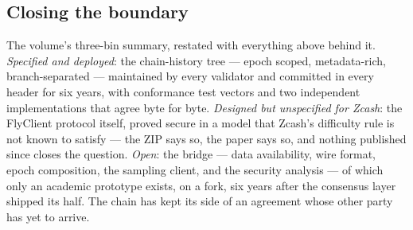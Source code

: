 \documentclass[11pt,a4paper]{article}
\theoremstyle{definition}
\begin{document}
\subsection{Closing the boundary}\label{sec:fc-closing}

The volume's three-bin summary, restated with everything above behind
it. \emph{Specified and deployed}: the chain-history tree --- epoch
scoped, metadata-rich, branch-separated --- maintained by every
validator and committed in every header for six years, with conformance
test vectors and two independent implementations that agree byte for
byte. \emph{Designed but unspecified for Zcash}: the FlyClient protocol
itself, proved secure in a model that Zcash's difficulty rule is not
known to satisfy --- the ZIP says so, the paper says so, and nothing
published since closes the question. \emph{Open}: the bridge --- data
availability, wire format, epoch composition, the sampling client, and
the security analysis --- of which only an academic prototype exists,
on a fork, six years after the consensus layer shipped its half. The
chain has kept its side of an agreement whose other party has yet to
arrive.
\end{document}
